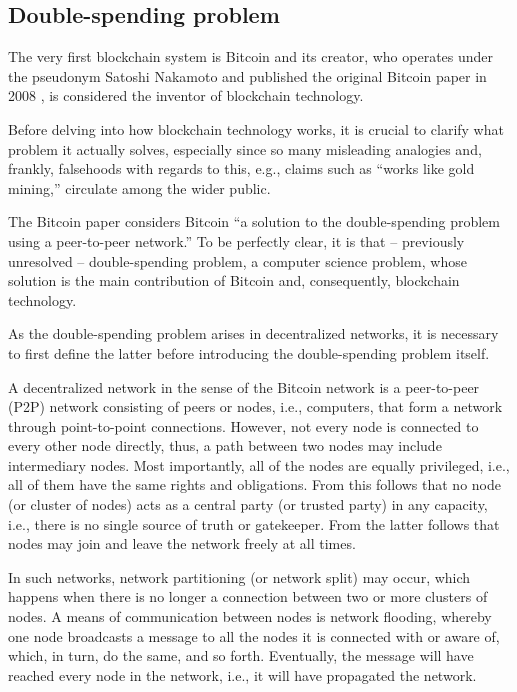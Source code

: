 \subsection{Double-spending problem}

The very first blockchain system is Bitcoin and its creator, who operates under the pseudonym Satoshi Nakamoto and published the original Bitcoin paper in 2008 \autocite{nakamoto2008}, is considered the inventor of blockchain technology.

Before delving into how blockchain technology works, it is crucial to clarify what problem it actually solves, especially since so many misleading analogies and, frankly, falsehoods with regards to this, e.g., claims such as ``works like gold mining,'' circulate among the wider public.

The Bitcoin paper considers Bitcoin ``a solution to the double-spending problem using a peer-to-peer network.'' \autocite[1]{nakamoto2008}
To be perfectly clear, it is that -- previously unresolved -- double-spending problem, a computer science problem, whose solution is the main contribution of Bitcoin and, consequently, blockchain technology.

As the double-spending problem arises in decentralized networks, it is necessary to first define the latter before introducing the double-spending problem itself.

A decentralized network in the sense of the Bitcoin network is a peer-to-peer (P2P) network consisting of peers or nodes, i.e., computers, that form a network through point-to-point connections.
However, not every node is connected to every other node directly, thus, a path between two nodes may include intermediary nodes.
Most importantly, all of the nodes are equally privileged, i.e., all of them have the same rights and obligations.
From this follows that no node (or cluster of nodes) acts as a central party (or trusted party) in any capacity, i.e., there is no single source of truth or gatekeeper.
From the latter follows that nodes may join and leave the network freely at all times.

In such networks, network partitioning (or network split) may occur, which happens when there is no longer a connection between two or more clusters of nodes.
A means of communication between nodes is network flooding, whereby one node broadcasts a message to all the nodes it is connected with or aware of, which, in turn, do the same, and so forth.
Eventually, the message will have reached every node in the network, i.e., it will have propagated the network.

